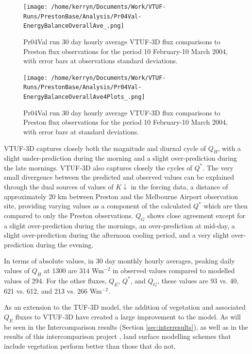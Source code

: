 \documentclass[preprint,12pt,authoryear]{elsarticle}
\begin{document}
\begin{figure}[!htbp] 
\texttt{[image: /home/kerryn/Documents/Work/VTUF-Runs/PrestonBase/Analysis/Pr04Val-EnergyBalanceOverallAve\_.png]}
\caption{Pr04Val run 30 day hourly average VTUF-3D flux comparisons to Preston flux observations for the period 10 February-10 March 2004, with error bars at observations standard deviations. \label{fig:Preston30Day}}      
\end{figure}

\begin{figure}[!htbp] 
\texttt{[image: /home/kerryn/Documents/Work/VTUF-Runs/PrestonBase/Analysis/Pr04Val-EnergyBalanceOverallAve4Plots\_.png]}
\caption{Pr04Val run 30 day hourly average VTUF-3D flux comparisons to Preston flux observations for the period 10 February-10 March 2004, with error bars at standard deviations. \label{fig:Preston30Day4} }     
\end{figure}

VTUF-3D captures closely both the magnitude and diurnal cycle of $Q_{H}$, with a slight under-prediction during the morning and a slight over-prediction during the late mornings. VTUF-3D also captures closely the cycles of $Q^{*}$. The very small divergence between the predicted and observed values can be explained through the dual sources of values of $K\downarrow$ in the forcing data, a distance of approximately 20 km between Preston and the Melbourne Airport observation site, providing varying values as a component of the calculated $Q^{*}$ which are then compared to only the Preston observations. $Q_{G}$ shows close agreement except for a slight over-prediction during the mornings, an over-prediction at mid-day, a slight over-prediction during the afternoon cooling period, and a very slight over-prediction during the evening.

In terms of absolute values, in 30 day monthly hourly averages, peaking daily values of $Q_{H}$ at 1300 are 314 Wm$^{-2}$ in observed values compared to modelled values of 294. For the other fluxes, $Q_{E}$, $Q^{*}$, and $Q_{G}$, these values are 93 vs. 40, 621 vs. 612, and 213 vs. 266 Wm$^{-2}$.

As an extension to the TUF-3D model, the addition of vegetation and associated $Q_{E}$ fluxes to VTUF-3D have created a large improvement to the model. As will be seen in the Intercomparison results (Section \ref{sec:interresults}), as well as in the results of this intercomparison project \citep{Grimmond2011,Best2012}, land surface modelling schemes that include vegetation perform better than those that do not. 
\end{document}
